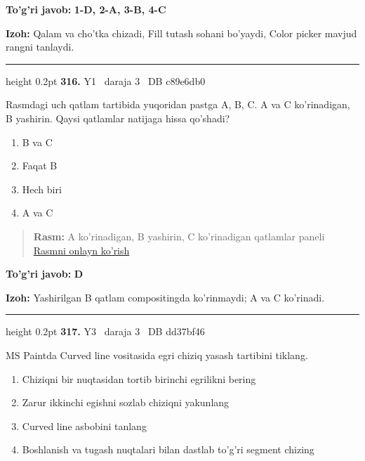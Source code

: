 \documentclass[10pt,a4paper,oneside]{article}
\begin{document}
\begin{tcolorbox}[enhanced,breakable,colback=teal!4,colframe=teal!45!black,boxrule=0.45pt,arc=1.2mm,left=2.8mm,right=2.8mm,top=2mm,bottom=2mm,before skip=2mm,after skip=2mm]
\textbf{\color{teal}To'g'ri javob:} \textbf{1-D, 2-A, 3-B, 4-C}
\par\smallskip
\textbf{Izoh:} Qalam va cho'tka chizadi, Fill tutash sohani bo'yaydi, Color picker mavjud rangni tanlaydi.
\end{tcolorbox}
\vspace{2mm}\hrule height 0.2pt \vspace{4mm}
\hypertarget{q316}{\textbf{\color{ink}316.}}  {\color{muted}\scriptsize Y1 \textbullet\ daraja 3 \textbullet\ DB c89e6db0}
\par
Rasmdagi uch qatlam tartibida yuqoridan pastga A, B, C. A va C ko'rinadigan, B yashirin. Qaysi qatlamlar natijaga hissa qo'shadi?
\begin{enumerate}[label=\Alph*),leftmargin=9mm]
\item B va C
\item Faqat B
\item Hech biri
\item A va C
\end{enumerate}
\begin{quote}\footnotesize\color{muted}\textbf{Rasm:} A ko'rinadigan, B yashirin, C ko'rinadigan qatlamlar paneli\\
\href{https://github.com/sarvar9417/attestatsiya/blob/main/public/graphics-web-v2/layer_stack.svg}{Rasmni onlayn ko'rish}
\end{quote}
\begin{tcolorbox}[enhanced,breakable,colback=teal!4,colframe=teal!45!black,boxrule=0.45pt,arc=1.2mm,left=2.8mm,right=2.8mm,top=2mm,bottom=2mm,before skip=2mm,after skip=2mm]
\textbf{\color{teal}To'g'ri javob:} \textbf{D}
\par\smallskip
\textbf{Izoh:} Yashirilgan B qatlam compositingda ko'rinmaydi; A va C ko'rinadi.
\end{tcolorbox}
\vspace{2mm}\hrule height 0.2pt \vspace{4mm}
\hypertarget{q317}{\textbf{\color{ink}317.}}  {\color{muted}\scriptsize Y3 \textbullet\ daraja 3 \textbullet\ DB dd37bf46}
\par
MS Paintda Curved line vositasida egri chiziq yasash tartibini tiklang.
\begin{enumerate}[label=\Alph*),leftmargin=9mm]
\item Chiziqni bir nuqtasidan tortib birinchi egrilikni bering
\item Zarur ikkinchi egishni sozlab chiziqni yakunlang
\item Curved line asbobini tanlang
\item Boshlanish va tugash nuqtalari bilan dastlab to'g'ri segment chizing
\end{enumerate}
\end{document}
